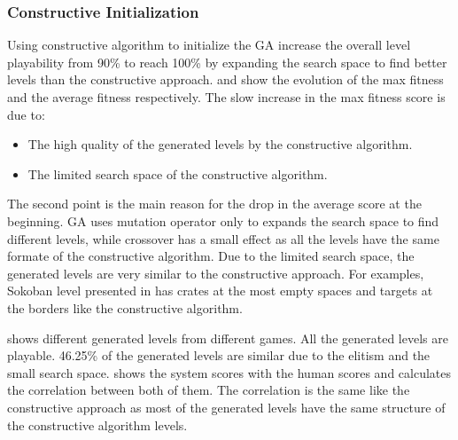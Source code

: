 \subsubsection{Constructive Initialization}
Using constructive algorithm to initialize the GA increase the overall level playability from 90\% to reach 100\% by expanding the search space to find better levels than the constructive approach.  and  show the evolution of the max fitness and the average fitness respectively. The slow increase in the max fitness score is due to:
\begin{itemize} \itemsep0pt \parskip0pt 
	\item The high quality of the generated levels by the constructive algorithm.
	\item The limited search space of the constructive algorithm.
\end{itemize}
The second point is the main reason for the drop in the average score at the beginning. GA uses mutation operator only to expands the search space to find different levels, while crossover has a small effect as all the levels have the same formate of the constructive algorithm. Due to the limited search space, the generated levels are very similar to the constructive approach. For examples, Sokoban level presented in  has crates at the most empty spaces and targets at the borders like the constructive algorithm.



 shows different generated levels from different games.  All the generated levels are playable. 46.25\% of the generated levels are similar due to the elitism and the small search space.  shows the system scores with the human scores and calculates the correlation between both of them. The correlation is the same like the constructive approach as most of the generated levels have the same structure of the constructive algorithm levels.


